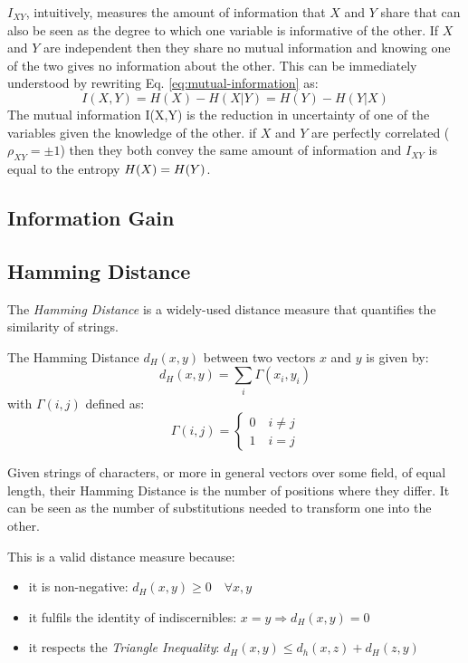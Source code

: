 $I_{XY}$, intuitively, measures the amount of information that $X$ and $Y$ share that can also be seen as the degree to which one variable is informative of the other.
If $X$ and $Y$ are independent then they share no mutual information and knowing one of the two gives no information about the other.
This can be immediately understood by rewriting Eq. \ref{eq:mutual-information} as:
\begin{equation}
	I(X,Y) = H(X) - H(X|Y) = H(Y) - H(Y|X)
\end{equation}
The mutual information I(X,Y) is the reduction in uncertainty of one of the variables given the knowledge of the other.
if $X$ and $Y$ are perfectly correlated ($\rho_{XY}= \pm 1$) then they both convey the same amount of information and $I_{XY}$ is equal to the entropy $H(X) = H(Y)$.

\subsection{Information Gain}


\subsection{Hamming Distance} \label{subsec:hamming-distance}
The \textit{Hamming Distance} is a widely-used distance measure that quantifies the similarity of strings.
\begin{definition}
	The Hamming Distance $d_H(x,y)$ between two vectors $x$ and $y$ is given by:
	\begin{equation}
		d_H(x,y) = \sum_i \Gamma(x_i, y_i)
	\end{equation}
	with $\Gamma(i,j)$ defined as:
	\begin{equation}
		\Gamma(i,j) = 
		\begin{cases}
			0 \quad i \neq j \\
			1 \quad i = j	
		\end{cases}
	\end{equation}
\end{definition}
Given strings of characters, or more in general vectors over some field, of equal length, their Hamming Distance is the number of positions where they differ.
It can be seen as the number of substitutions needed to transform one into the other.

This is a valid distance measure because:
\begin{itemize}
  \item it is non-negative: $d_H(x,y) \geq 0 \quad \forall x, y$
  \item it fulfils the identity of indiscernibles: $x = y \Rightarrow d_H(x,y)=0$
  \item it respects the \textit{Triangle Inequality}: $d_H(x,y) \leq d_h(x,z) + d_H(z,y) $
\end{itemize}

